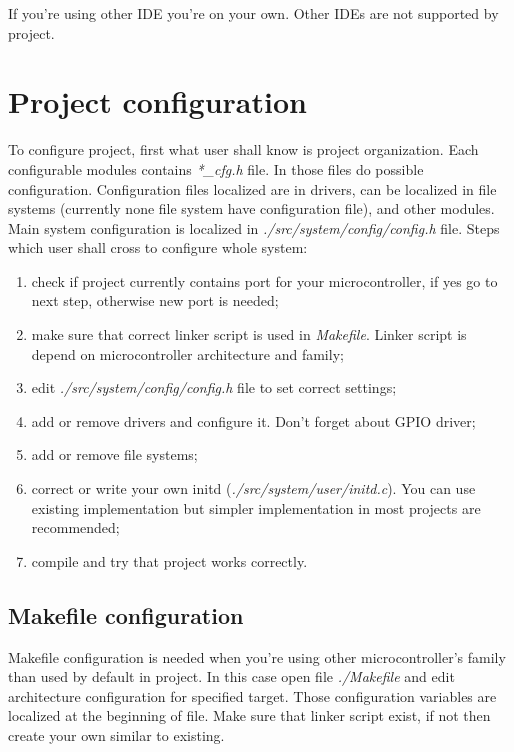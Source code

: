 \documentclass[a4paper,11pt]{report}
\renewcommand{\path}[1]{\textit{#1}}
\begin{document}
If you're using other IDE you're on your own. Other IDEs are not supported by project.


\chapter{Project configuration}\label{sec:proj_cfg}
To configure project, first what user shall know is project organization. Each configurable modules
contains \path{*\_cfg.h} file. In those files do possible configuration. Configuration files
localized are in drivers, can be localized in file systems (currently none file system have
configuration file), and other modules. Main system configuration is localized in
\path{./src/system/config/config.h} file.
Steps which user shall cross to configure whole system:
\begin{enumerate}
   \item check if project currently contains port for your microcontroller, if yes go to next step,
         otherwise new port is needed;
   \item make sure that correct linker script is used in \path{Makefile}. Linker script is depend
         on microcontroller architecture and family;
   \item edit \path{./src/system/config/config.h} file to set correct settings;
   \item add or remove drivers and configure it. Don't forget about GPIO driver;
   \item add or remove file systems;
   \item correct or write your own initd (\path{./src/system/user/initd.c}). You can use existing
         implementation but simpler implementation in most projects are recommended;
   \item compile and try that project works correctly.
\end{enumerate}

\section{Makefile configuration}
Makefile configuration is needed when you're using other microcontroller's family than used by
default in project. In this case open file \path{./Makefile} and edit architecture configuration
for specified target. Those configuration variables are localized at the beginning of file. Make
sure that linker script exist, if not then create your own similar to existing.
\end{document}
